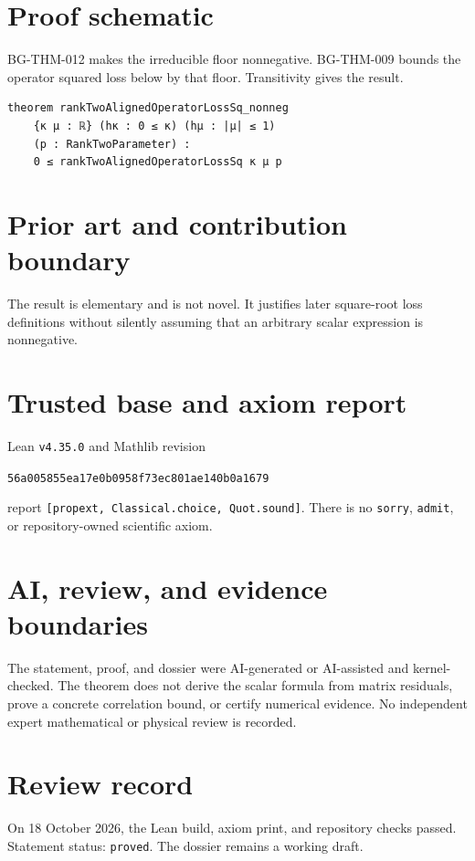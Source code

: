 \documentclass[11pt]{article}
\begin{document}
\section{Proof schematic}
BG-THM-012 makes the irreducible floor nonnegative. BG-THM-009 bounds the operator
squared loss below by that floor. Transitivity gives the result.

\begin{lstlisting}
theorem rankTwoAlignedOperatorLossSq_nonneg
    {κ μ : ℝ} (hκ : 0 ≤ κ) (hμ : |μ| ≤ 1)
    (p : RankTwoParameter) :
    0 ≤ rankTwoAlignedOperatorLossSq κ μ p
\end{lstlisting}

\section{Prior art and contribution boundary}
The result is elementary and is not novel. It justifies later square-root loss definitions
without silently assuming that an arbitrary scalar expression is nonnegative.

\section{Trusted base and axiom report}
Lean \texttt{v4.35.0} and Mathlib revision
\begin{center}\texttt{56a005855ea17e0b0958f73ec801ae140b0a1679}\end{center}
report \texttt{[propext, Classical.choice, Quot.sound]}. There is no \texttt{sorry},
\texttt{admit}, or repository-owned scientific axiom.

\section{AI, review, and evidence boundaries}
The statement, proof, and dossier were AI-generated or AI-assisted and kernel-checked.
The theorem does not derive the scalar formula from matrix residuals, prove a concrete
correlation bound, or certify numerical evidence. No independent expert mathematical or
physical review is recorded.

\section{Review record}
On 18 October 2026, the Lean build, axiom print, and repository checks passed. Statement
status: \texttt{proved}. The dossier remains a working draft.
\end{document}
